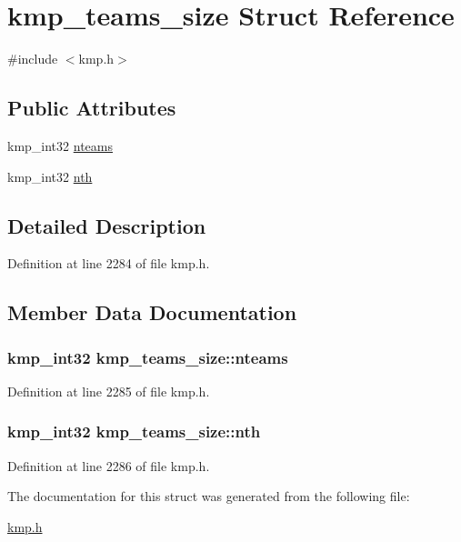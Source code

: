 \hypertarget{structkmp__teams__size}{\section{kmp\-\_\-teams\-\_\-size Struct Reference}
\label{structkmp__teams__size}
}


{\ttfamily \#include $<$kmp.\-h$>$}

\subsection*{Public Attributes}
\begin{DoxyCompactItemize}
\item 
kmp\-\_\-int32 \hyperlink{structkmp__teams__size_a0ab7ecda4a625251289bbc7c5ba24a68}{nteams}
\item 
kmp\-\_\-int32 \hyperlink{structkmp__teams__size_ade477d8c54972a85dc731bc3400bef7d}{nth}
\end{DoxyCompactItemize}


\subsection{Detailed Description}


Definition at line 2284 of file kmp.\-h.



\subsection{Member Data Documentation}
\hypertarget{structkmp__teams__size_a0ab7ecda4a625251289bbc7c5ba24a68}{
\subsubsection[{nteams}]{\setlength{\rightskip}{0pt plus 5cm}kmp\-\_\-int32 kmp\-\_\-teams\-\_\-size\-::nteams}}\label{structkmp__teams__size_a0ab7ecda4a625251289bbc7c5ba24a68}


Definition at line 2285 of file kmp.\-h.

\hypertarget{structkmp__teams__size_ade477d8c54972a85dc731bc3400bef7d}{
\subsubsection[{nth}]{\setlength{\rightskip}{0pt plus 5cm}kmp\-\_\-int32 kmp\-\_\-teams\-\_\-size\-::nth}}\label{structkmp__teams__size_ade477d8c54972a85dc731bc3400bef7d}


Definition at line 2286 of file kmp.\-h.



The documentation for this struct was generated from the following file\-:\begin{DoxyCompactItemize}
\item 
\hyperlink{kmp_8h}{kmp.\-h}\end{DoxyCompactItemize}
